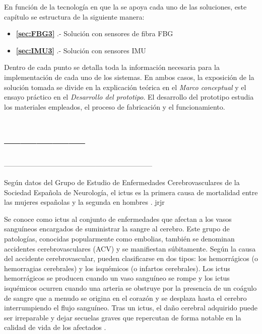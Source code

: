 En función de la tecnología en que la se apoya cada uno de las soluciones, %
este capítulo se estructura de la siguiente manera: 
\begin{itemize}
	\item {\textbf{\ref{sec:FBG3}}    .- Solución con sensores de fibra FBG} 
	\item {\textbf{\ref{sec:IMU3}}    .- Solución con sensores IMU}
\end{itemize}
Dentro de cada punto se detalla toda la información necesaria para la implementación de cada uno de los sistemas. En ambos casos, la exposición de la solución tomada se divide en la explicación teórica en el \textit{Marco conceptual} y el ensayo práctico en el \textit{Desarrollo del prototipo}. El desarrollo del prototipo estudia los materiales empleados, el proceso de fabricación y el funcionamiento. 



\section{---------------}

---------------------------------------------------------------

Según datos del Grupo de Estudio de Enfermedades Cerebrovasculares de la Sociedad Española de Neurología, el ictus es la primera causa de mortalidad entre las mujeres españolas y la segunda en hombres \cite{ictuss}. jrjr

Se conoce como ictus al conjunto de enfermedades que afectan a los vasos sanguíneos encargados de suministrar la sangre al cerebro. Este grupo de patologías, conocidas popularmente como embolias, también se denominan accidentes cerebrovasculares (ACV) y se manifiestan súbitamente. Según la causa del accidente cerebrovascular, pueden clasificarse en dos tipos: los hemorrágicos (o hemorragias cerebrales) y los isquémicos (o infartos cerebrales). Los ictus hemorrágicos se producen cuando un vaso sanguíneo se rompe y los ictus isquémicos ocurren cuando una arteria se obstruye por la presencia de un coágulo de sangre que a menudo se origina en el corazón y se desplaza hasta el cerebro interrumpiendo el flujo sanguíneo. Tras un ictus, el daño cerebral adquirido puede ser irreparable y dejar secuelas graves que repercutan de forma notable en la calidad de vida de los afectados \cite{ictus_def}.

